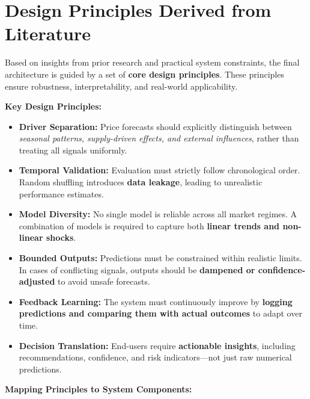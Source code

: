 \documentclass[12pt,a4paper]{report}
\begin{document}
\section{Design Principles Derived from Literature}

\noindent
Based on insights from prior research and practical system constraints, the final architecture is guided by a set of \textbf{core design principles}. These principles ensure robustness, interpretability, and real-world applicability.

\vspace{0.5em}

\noindent
\textbf{Key Design Principles:}
\begin{itemize}
    \item \textbf{Driver Separation:}  
    Price forecasts should explicitly distinguish between \textit{seasonal patterns, supply-driven effects, and external influences}, rather than treating all signals uniformly.

    \item \textbf{Temporal Validation:}  
    Evaluation must strictly follow chronological order. Random shuffling introduces \textbf{data leakage}, leading to unrealistic performance estimates.

    \item \textbf{Model Diversity:}  
    No single model is reliable across all market regimes. A combination of models is required to capture both \textbf{linear trends and non-linear shocks}.

    \item \textbf{Bounded Outputs:}  
    Predictions must be constrained within realistic limits. In cases of conflicting signals, outputs should be \textbf{dampened or confidence-adjusted} to avoid unsafe forecasts.

    \item \textbf{Feedback Learning:}  
    The system must continuously improve by \textbf{logging predictions and comparing them with actual outcomes} to adapt over time.

    \item \textbf{Decision Translation:}  
    End-users require \textbf{actionable insights}, including recommendations, confidence, and risk indicators—not just raw numerical predictions.
\end{itemize}

\vspace{0.7em}

\noindent
\textbf{Mapping Principles to System Components:}
\end{document}
